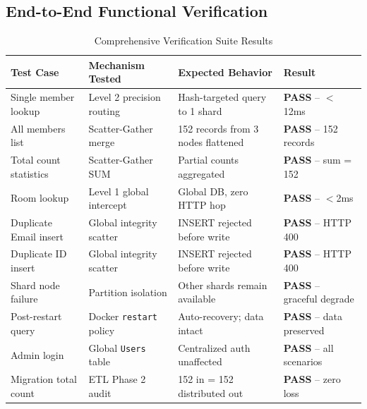 \documentclass[sigconf]{acmart}
\newcommand{\theadbf}[1]{\textbf{#1}}
\begin{document}
\subsection{End-to-End Functional Verification}

\begin{table}[t]
\centering
\caption{Comprehensive Verification Suite Results}
\label{tab:verification}
\renewcommand{\arraystretch}{1.3}
\begin{tabular}{|L{3.2cm}|L{2.5cm}|L{3.5cm}|L{3.5cm}|}
\hline
{}\color{white}\theadbf{Test Case} & \color{white}\theadbf{Mechanism Tested} & \color{white}\theadbf{Expected Behavior} & \color{white}\theadbf{Result} \\
\hline
Single member lookup & Level 2 precision routing & Hash-targeted query to 1 shard & \textbf{PASS} -- $<$12ms \\
\hline
{}All members list & Scatter-Gather merge & 152 records from 3 nodes flattened & \textbf{PASS} -- 152 records \\
\hline
Total count statistics & Scatter-Gather SUM & Partial counts aggregated & \textbf{PASS} -- sum = 152 \\
\hline
{}Room lookup & Level 1 global intercept & Global DB, zero HTTP hop & \textbf{PASS} -- $<$2ms \\
\hline
Duplicate Email insert & Global integrity scatter & INSERT rejected before write & \textbf{PASS} -- HTTP 400 \\
\hline
{}Duplicate ID insert & Global integrity scatter & INSERT rejected before write & \textbf{PASS} -- HTTP 400 \\
\hline
Shard node failure & Partition isolation & Other shards remain available & \textbf{PASS} -- graceful degrade \\
\hline
{}Post-restart query & Docker \texttt{restart} policy & Auto-recovery; data intact & \textbf{PASS} -- data preserved \\
\hline
Admin login & Global \texttt{Users} table & Centralized auth unaffected & \textbf{PASS} -- all scenarios \\
\hline
{}Migration total count & ETL Phase 2 audit & 152 in = 152 distributed out & \textbf{PASS} -- zero loss \\
\hline
\end{tabular}
\end{table}

\end{document}
